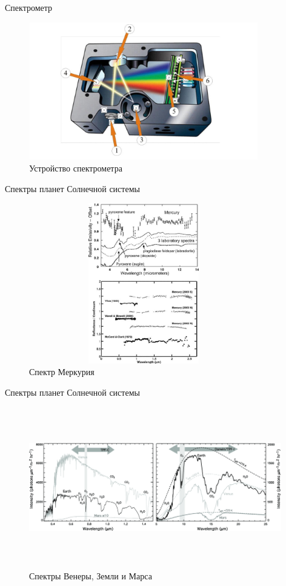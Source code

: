 \documentclass[
]{beamer}
\begin{document}
	
	\begin{frame}{Спектрометр}
	\begin{figure}[H]
		\centering
		\includegraphics[width=10cm, height=6cm]{спектрометр.png}
		\caption{Устройство спектрометра}
	\end{figure}
	\end{frame}
	
	\begin{frame}{Спектры планет Солнечной системы}
		\begin{figure}[H]
			\centering
			\includegraphics[width=10cm, height=7cm]{меркуриий_спектр.png}
			\caption{Спектр Меркурия}
		\end{figure}
	\end{frame}

	\begin{frame}{Спектры планет Солнечной системы}
		\begin{figure}[H]
			\centering
			\includegraphics[width=11cm, height=7cm]{взм.png}
			\caption{Спектры Венеры, Земли и Марса}
		\end{figure}
	\end{frame}
\end{document}
